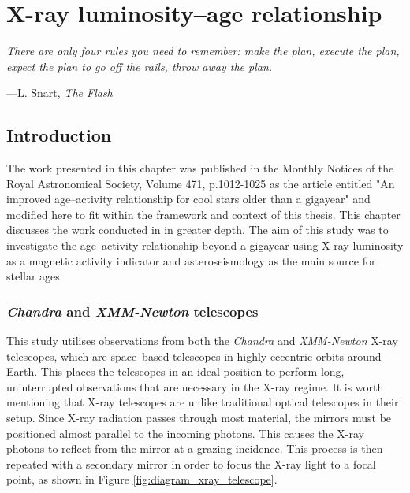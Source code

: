 
\chapter{X-ray luminosity--age relationship} %

\label{Chapter3} %
\newcommand{\Chandra}{\textit{Chandra}\xspace}
\newcommand{\XMM}{\textit{XMM-Newton}\xspace}

\epigraph{\itshape There are only four rules you need to remember: make the plan, execute the plan, expect the plan to go off the rails, throw away the plan.}{---L. Snart, \itshape The Flash}

\section{Introduction}
The work presented in this chapter was published in the Monthly Notices of the Royal Astronomical Society, Volume 471, p.1012-1025 as the article entitled "An improved age--activity relationship for cool stars older than a gigayear" \citep{Booth_etal_2017} and modified here to fit within the framework and context of this thesis. This chapter discusses the work conducted in \citet{Booth_etal_2017} in greater depth. The aim of this study was to investigate the age--activity relationship beyond a gigayear using X-ray luminosity as a magnetic activity indicator and asteroseismology as the main source for stellar ages.

\subsection{\textit{Chandra} and \textit{XMM-Newton} telescopes}
This study utilises observations from both the \Chandra and \XMM X-ray telescopes, which are space--based telescopes in highly eccentric orbits around Earth. This places the telescopes in an ideal position to perform long, uninterrupted observations that are necessary in the X-ray regime. It is worth mentioning that X-ray telescopes are unlike traditional optical telescopes in their setup. Since X-ray radiation passes through most material, the mirrors must be positioned almost parallel to the incoming photons. This causes the X-ray photons to reflect from the mirror at a grazing incidence. This process is then repeated with a secondary mirror in order to focus the X-ray light to a focal point, as shown in Figure \ref{fig:diagram_xray_telescope}.

